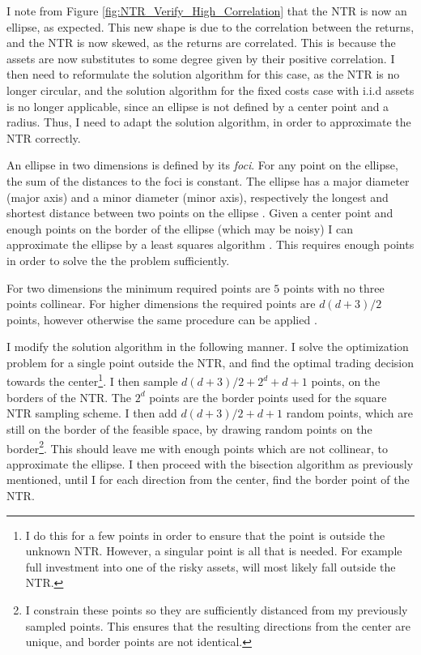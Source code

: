 \documentclass[11pt]{article}
\begin{document}
I note from Figure \ref{fig:NTR_Verify_High_Correlation} that the NTR is now an ellipse, as expected.
This new shape is due to the correlation between the returns, and the NTR is now skewed, as the returns are correlated.
This is because the assets are now substitutes to some degree given by their positive correlation.
I then need to reformulate the solution algorithm for this case, as the NTR is no longer circular, and the solution algorithm for the fixed costs case with i.i.d assets is no longer applicable,
since an ellipse is not defined by a center point and a radius. Thus, I need to adapt the solution algorithm, in order to approximate the NTR correctly.

An ellipse in two dimensions is defined by its \textit{foci}. For any point on the ellipse, the sum of the distances to the foci is constant.
The ellipse has a major diameter (major axis) and a minor diameter (minor axis), respectively the longest and shortest distance between two points on the ellipse
\autocite{Ivanov2020Ellipse}. Given a center point and enough points on the border of the ellipse (which may be noisy)
I can approximate the ellipse by a least squares algorithm \autocite{gander1994least}. This requires enough points in order to solve the the problem sufficiently.

For two dimensions the minimum required points are $5$ points with no three points collinear. For higher dimensions the required points are $d(d+3)/2$ points,
however otherwise the same procedure can be applied \autocite{bertoni2010multi}.

I modify the solution algorithm in the following manner.
I solve the optimization problem for a single point outside the NTR, and find the optimal trading decision 
towards the center\footnote{I do this for a few points in order to ensure that the point is outside the unknown NTR. However, a singular point is all that is needed. 
For example full investment into one of the risky assets, will most likely fall outside the NTR.}.
I then sample $d(d+3)/2+2^{d}+d+1$ points, on the borders of the NTR. The $2^{d}$ points are the border points used for the square \ac{NTR} sampling scheme.
I then add $d(d+3)/2+d+1$ random points, which are still on the border of the feasible space, 
by drawing random points on the border\footnote{I constrain these points so they are sufficiently distanced from my previously sampled points. This ensures that the resulting directions from the center are unique, and border points are not identical.}.
This should leave me with enough points which are not collinear, to approximate the ellipse.
I then proceed with the bisection algorithm as previously mentioned, until I for each direction from the center, find the border point of the \ac{NTR}.
\end{document}
